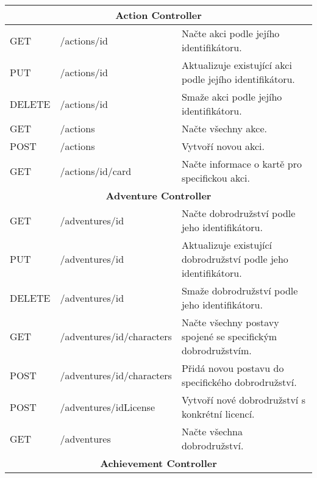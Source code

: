 \begin{longtable}{|l|l|p{}|}
    \multicolumn{3}{|c|}{\textbf{Action Controller}}                                                                    \\
    \hline
    GET             & /actions/{id}               & Načte akci podle jejího identifikátoru.                             \\
    PUT             & /actions/{id}               & Aktualizuje existující akci podle jejího identifikátoru.            \\
    DELETE          & /actions/{id}               & Smaže akci podle jejího identifikátoru.                             \\
    GET             & /actions                    & Načte všechny akce.                                                 \\
    POST            & /actions                    & Vytvoří novou akci.                                                 \\
    GET             & /actions/{id}/card          & Načte informace o kartě pro specifickou akci.                       \\
    \hline
    \multicolumn{3}{|c|}{\textbf{Adventure Controller}}                                                                 \\
    \hline
    GET             & /adventures/{id}            & Načte dobrodružství podle jeho identifikátoru.                      \\
    PUT             & /adventures/{id}            & Aktualizuje existující dobrodružství podle jeho identifikátoru.     \\
    DELETE          & /adventures/{id}            & Smaže dobrodružství podle jeho identifikátoru.                      \\
    GET             & /adventures/{id}/characters & Načte všechny postavy spojené se specifickým dobrodružstvím.        \\
    POST            & /adventures/{id}/characters & Přidá novou postavu do specifického dobrodružství.                  \\
    POST            & /adventures/{idLicense}     & Vytvoří nové dobrodružství s konkrétní licencí.                     \\
    GET             & /adventures                 & Načte všechna dobrodružství.                                        \\
    \hline
    \multicolumn{3}{|c|}{\textbf{Achievement Controller}}                                                               \\

\end{longtable}
